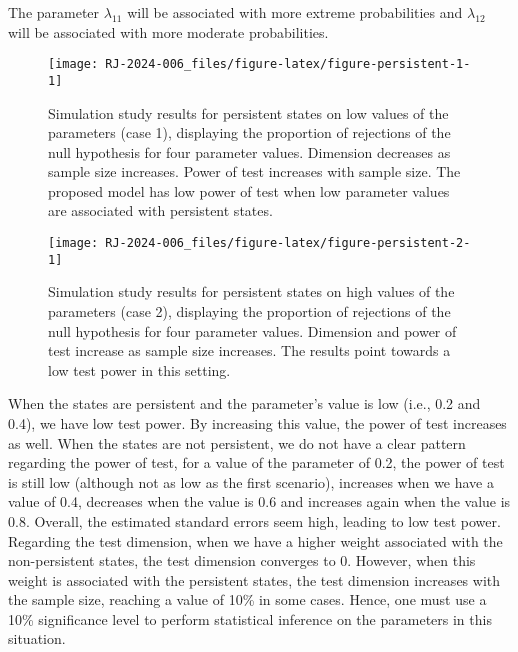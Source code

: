 The parameter \(\lambda_{11}\) will be associated with more extreme probabilities and \(\lambda_{12}\) will be associated with more moderate probabilities.

\begin{figure}

{\centering \texttt{[image: RJ-2024-006\_files/figure-latex/figure-persistent-1-1]} 

}

\caption{Simulation study results for persistent states on low values of the parameters (case 1), displaying the proportion of rejections of the null hypothesis for four parameter values. Dimension decreases as sample size increases. Power of test increases with sample size. The proposed model has low power of test when low parameter values are associated with persistent states.}\label{fig:figure-persistent-1}
\end{figure}

\begin{figure}

{\centering \texttt{[image: RJ-2024-006\_files/figure-latex/figure-persistent-2-1]} 

}

\caption{Simulation study results for persistent states on high values of the parameters (case 2), displaying the proportion of rejections of the null hypothesis for four parameter values. Dimension and power of test increase as sample size increases. The results point towards a low test power in this setting.}\label{fig:figure-persistent-2}
\end{figure}

When the states are persistent and the parameter's value is low (i.e., 0.2 and 0.4), we have low test power. By increasing this value, the power of test increases as well. When the states are not persistent, we do not have a clear pattern regarding the power of test, for a value of the parameter of 0.2, the power of test is still low (although not as low as the first scenario), increases when we have a value of 0.4, decreases when the value is 0.6 and increases again when the value is 0.8. Overall, the estimated standard errors seem high, leading to low test power. Regarding the test dimension, when we have a higher weight associated with the non-persistent states, the test dimension converges to 0. However, when this weight is associated with the persistent states, the test dimension increases with the sample size, reaching a value of 10\% in some cases. Hence, one must use a 10\% significance level to perform statistical inference on the parameters in this situation.

